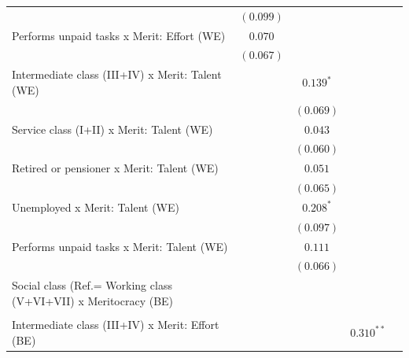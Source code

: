 \documentclass[
  12pt,
]{article}
\begin{document}
\begin{table}
\begin{center}
{\begin{tabular}{l c c c c}
                                                                & $(0.099)$   &             &              &              \\
\quad Performs unpaid tasks x Merit: Effort (WE)                & $0.070$     &             &              &              \\
                                                                & $(0.067)$   &             &              &              \\
\quad Intermediate class (III+IV) x Merit: Talent (WE)          &             & $0.139^{*}$ &              &              \\
                                                                &             & $(0.069)$   &              &              \\
\quad Service class (I+II) x Merit: Talent (WE)                 &             & $0.043$     &              &              \\
                                                                &             & $(0.060)$   &              &              \\
\quad Retired or pensioner x Merit: Talent (WE)                 &             & $0.051$     &              &              \\
                                                                &             & $(0.065)$   &              &              \\
\quad Unemployed x Merit: Talent (WE)                           &             & $0.208^{*}$ &              &              \\
                                                                &             & $(0.097)$   &              &              \\
\quad Performs unpaid tasks x Merit: Talent (WE)                &             & $0.111$     &              &              \\
                                                                &             & $(0.066)$   &              &              \\
Social class (Ref.= Working class (V+VI+VII) x Meritocracy (BE) &             &             &              &              \\
                                                                &             &             &              &              \\
\quad Intermediate class (III+IV) x Merit: Effort (BE)          &             &             & $0.310^{**}$ &              \\

\end{tabular}}
\end{center}
\end{table}
\end{document}
